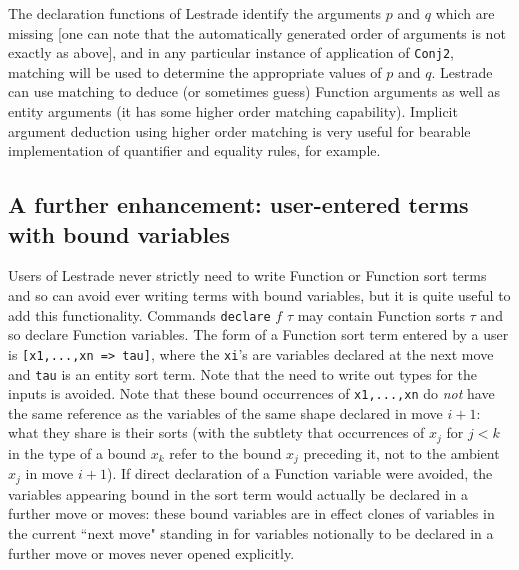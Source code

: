 \documentclass{article}
\begin{document}
The declaration functions of Lestrade identify the arguments $p$ and $q$ which are missing [one can note that the automatically generated order of arguments is not exactly as above], and in any particular instance of application of {\tt Conj2}, matching will be used to determine the appropriate values of $p$ and $q$.  Lestrade can use matching to deduce (or sometimes guess) Function arguments as well as entity arguments (it has some higher order matching capability).  Implicit argument deduction using higher order matching is very useful for bearable implementation of quantifier and equality rules, for example.





\subsection{A further enhancement:  user-entered terms with bound variables}

Users of Lestrade never strictly need to write Function or Function sort terms and so can avoid ever writing terms with bound variables, but it is quite useful to add this functionality.  Commands {\tt declare} $f$ $\tau$ may contain Function sorts $\tau$ and so declare Function variables.  The form of a Function sort term entered by a user is {\tt [x1,...,xn => tau]}, where the {\tt xi}'s are variables declared at the next move and {\tt tau} is an entity sort term.  Note that the need to write out types for the inputs is avoided.  Note that these bound occurrences of {\tt x1,...,xn} do {\em not\/} have the same reference as the variables of the same shape declared in move $i+1$:  what they share is their sorts (with the subtlety that occurrences of $x_j$ for $j<k$ in the type of a bound $x_k$ refer to the bound $x_j$ preceding it, not to the ambient $x_j$ in move $i+1$).  If direct declaration of a Function variable were avoided, the variables appearing bound in the sort term would actually be declared in a further move or moves:  these bound variables are in effect clones of variables in the current ``next move" standing in for variables notionally to be declared in a further move or moves never opened explicitly.
\end{document}
